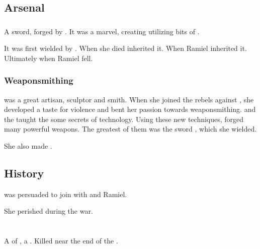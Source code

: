 \subsection{Arsenal}
\subsubsection{\Ascaril}
\index{\Ascaril}
A  sword, forged by \Lyorith. 
It was a marvel, creating utilizing bits of . 

It was first wielded by \Lyorith. 
When she died \Nathrach{} inherited it. 
When  Ramiel inherited it. 
Ultimately  when Ramiel fell. 





\subsubsection{Weaponsmithing}
\Lyorith{} was a great artisan, sculptor and smith. 
When she joined the rebels against \Merkyrah, she developed a taste for violence and bent her passion towards weaponsmithing. 
\Semiza{} and the \banelords{} taught the \resphain{} some secrets of technology. 
Using these new techniques, \Lyorith{} forged many powerful weapons. 
The greatest of them was the sword , which she wielded. 

She also made . 









\subsection{History}
\Lyorith{} was persuaded to join \Mystraacht{} with \Nathrach{} and Ramiel. 

She perished during the \Merkyran{} war. 















\section[Nathrach]{\Nathrach}
\index{\Nathrach}
A \resphan{} of \Mystraacht, a \sathariah. 
Killed near the end of the \secondbanewar. 

